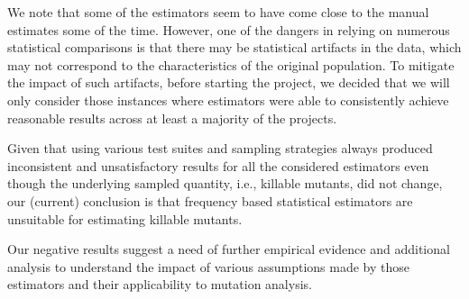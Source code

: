\documentclass[sigconf,review,anonymous]{acmart}
\begin{document}
We note that some of the estimators seem to have come close to the manual
estimates some of the time. However, one of the dangers in relying on numerous
statistical comparisons is that there may be statistical artifacts in the data,
which may not correspond to the characteristics of the original population.
To mitigate the impact of such artifacts, before starting the project, we
decided that we will only consider those instances where estimators were
able to consistently achieve reasonable results across at least a majority of
the projects.



Given that using various test suites and sampling strategies always produced
inconsistent and unsatisfactory results for all the considered estimators
even though the underlying sampled quantity, i.e., killable mutants, did not
change, our (current) conclusion is that frequency based statistical %
estimators are unsuitable for estimating killable mutants.

Our negative results
suggest a need of further empirical evidence and additional analysis
to understand the impact of various assumptions made by those %
estimators and their applicability to mutation analysis.
%






%
\end{document}
